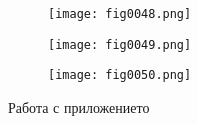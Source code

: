 \begin{figure}[H]
  \begin{subfigure}{0.31\textwidth}
  \texttt{[image: fig0048.png]}
  \label{fig0048}
  \end{subfigure}
  \begin{subfigure}{0.31\textwidth}
  \texttt{[image: fig0049.png]}
  \label{fig0049}
  \end{subfigure}
  \begin{subfigure}{0.31\textwidth}
  \texttt{[image: fig0050.png]}
  \label{fig0050}
  \end{subfigure}
  \caption{Работа с приложението}
\end{figure}


